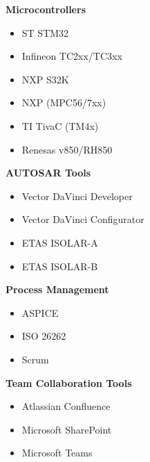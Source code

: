 \begin{minipage}[t]{0.48\textwidth}
\textbf{Microcontrollers}
\begin{itemize}[leftmargin=*,noitemsep,topsep=0pt]
    \item ST STM32 
    \item Infineon TC2xx/TC3xx 
    \item NXP S32K 
    \item NXP (MPC56/7xx) 
    \item TI TivaC (TM4x) 
    \item Renesas v850/RH850 
\end{itemize}

\vspace{0.5em}

\textbf{AUTOSAR Tools}
\begin{itemize}[leftmargin=*,noitemsep,topsep=0pt]
    \item Vector DaVinci Developer 
    \item Vector DaVinci Configurator 
    \item ETAS ISOLAR-A 
    \item ETAS ISOLAR-B 
\end{itemize}

\vspace{0.5em}

\textbf{Process Management}
\begin{itemize}[leftmargin=*,noitemsep,topsep=0pt]
    \item ASPICE 
    \item ISO 26262 
    \item Scrum 
\end{itemize}

\vspace{0.5em}

\textbf{Team Collaboration Tools}
\begin{itemize}[leftmargin=*,noitemsep,topsep=0pt]
    \item Atlassian Confluence 
    \item Microsoft SharePoint 
    \item Microsoft Teams 
\end{itemize}

\vspace{0.5em}


\end{minipage}
